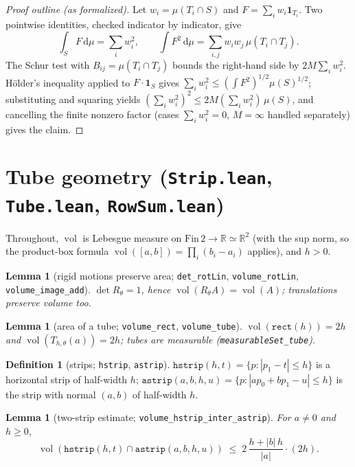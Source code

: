 \documentclass[11pt,a4paper]{article}
\newcommand{\R}{\mathbb{R}}
\newcommand{\vol}{\operatorname{vol}}                %
\newcommand{\dd}{\mathrm{d}}
\newcommand{\FinTwo}{\ensuremath{\mathrm{Fin}\,2 \to \R}}
\newcommand{\tube}{T}                                %
\newcommand{\ind}{\mathbf{1}}
\newcommand{\lname}[1]{\texttt{#1}}                  %
\newtheorem{lemma}[theorem]{Lemma}
\theoremstyle{definition}
\newtheorem{definition}[theorem]{Definition}
\theoremstyle{remark}
\begin{document}
\begin{proof}[Proof outline (as formalized)]
Let $w_i=\mu(T_i\cap S)$ and $F=\sum_i w_i\ind_{T_i}$.  Two pointwise identities,
checked indicator by indicator, give
\[
  \int_S F\,\dd\mu = \sum_i w_i^2,
  \qquad
  \int F^{2}\,\dd\mu = \sum_{i,j} w_i w_j\,\mu(T_i\cap T_j).
\]
The Schur test with $B_{ij}=\mu(T_i\cap T_j)$ bounds the right-hand side by
$2M\sum_i w_i^2$.  H\"older's inequality applied to $F\cdot\ind_S$ gives
$\sum_i w_i^2 \le (\int F^2)^{1/2}\mu(S)^{1/2}$; substituting and squaring yields
$(\sum_i w_i^2)^2\le 2M(\sum_i w_i^2)\,\mu(S)$, and cancelling the finite nonzero factor
(cases $\sum_i w_i^2=0$, $M=\infty$ handled separately) gives the claim.
\end{proof}

\section{Tube geometry (\lname{Strip.lean}, \lname{Tube.lean}, \lname{RowSum.lean})}

Throughout, $\vol$ is Lebesgue measure on $\FinTwo\simeq\R^2$ (with the sup norm, so the
product-box formula $\vol([a,b])=\prod_i(b_i-a_i)$ applies), and
$h>0$.

\begin{lemma}[{rigid motions preserve area; \lname{det\_rotLin}, \lname{volume\_rotLin},
\lname{volume\_image\_add}}]
$\det R_\theta = 1$, hence $\vol(R_\theta A)=\vol(A)$; translations preserve volume too.
\end{lemma}

\begin{lemma}[{area of a tube; \lname{volume\_rect}, \lname{volume\_tube}}]
$\vol(\lname{rect}(h)) = 2h$ and $\vol(\tube_{h,\theta}(a))=2h$; tubes are measurable
(\lname{measurableSet\_tube}).
\end{lemma}

\begin{definition}[{strips; \lname{hstrip}, \lname{astrip}}]
$\lname{hstrip}(h,t)=\{p : |p_1 - t|\le h\}$ is a horizontal strip of half-width $h$;
$\lname{astrip}(a,b,h,u)=\{p : |a p_0 + b p_1 - u|\le h\}$ is the strip with normal
$(a,b)$ of half-width $h$.
\end{definition}

\begin{lemma}[{two-strip estimate; \lname{volume\_hstrip\_inter\_astrip}}]
\label{lem:two-strip}
For $a\neq0$ and $h\ge0$,
\[
  \vol(\lname{hstrip}(h,t)\cap \lname{astrip}(a,b,h,u))
  \;\le\; 2\,\frac{h+|b|\,h}{|a|}\cdot(2h).
\]
\end{lemma}
\end{document}

